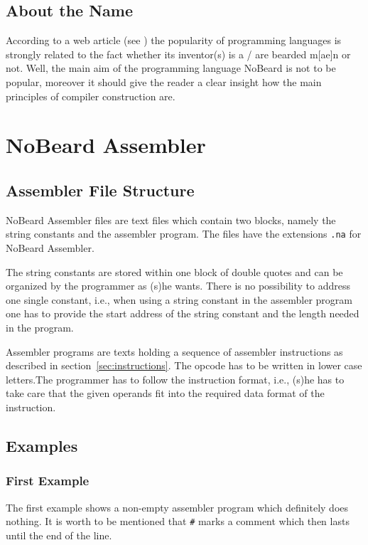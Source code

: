 \documentclass[11pt]{report}
\newcommand{\leongage}{NoBeard}
\begin{document}
\section{About the Name}
According to a web article (see \cite{khason_computer_2008}) the popularity of programming languages is strongly related to the fact whether its inventor(s) is a / are  bearded m[ae]n or not. Well, the main aim of the programming language \leongage{} is not to be popular,
moreover it should give the reader a clear insight how the main principles of compiler construction are.



\chapter{\leongage{} Assembler}
\section{Assembler File Structure}
\leongage{} Assembler files are text files which contain two blocks, namely the string constants and the assembler program. The files have the extensions \lstinline$.na$ for \leongage{} Assembler.

The string constants are stored within one block of double quotes and can be organized by the programmer as (s)he wants. There is no possibility to address one single constant, i.e., when using a string constant in the assembler program one has to provide the start address of the string constant and the length needed in the program.

Assembler programs are texts holding a sequence of assembler instructions as described in section~\ref{sec:instructions}. The opcode has to be written in lower case letters.The programmer has to follow the instruction format, i.e., (s)he has to take care that the given operands fit into the required data format of the instruction.

\section{Examples}
\subsection{First Example}
The first example shows a non-empty assembler program which definitely does nothing. It is worth to be mentioned that \lstinline$#$ marks a comment which then lasts until the end of the line. 
\newcommand{\assemblerfilepath}{../../NoBeardProject/SamplePrograms/NbAssemblerPrograms/}
\lstset{language=NoBeardAsm}

\end{document}
